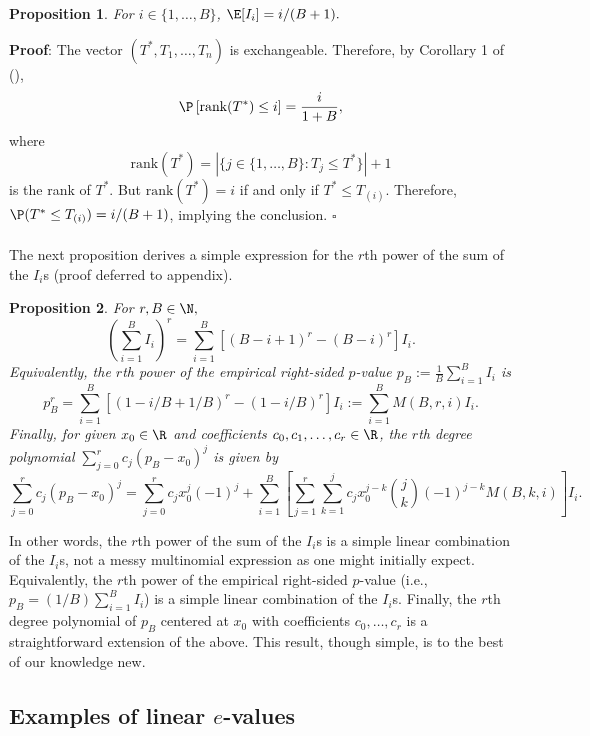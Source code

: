 \documentclass[12pt]{article}
\newtheorem{proposition}{Proposition}
\begin{document}
\begin{proposition}
For $i \in \{1, \dots, B\}$, $\E[I_i] = i/(B+1).$
\end{proposition}
\textbf{Proof}: The vector $(T^*, T_1, \dots, T_n)$ is exchangeable. Therefore, by Corollary 1 of (\cite{Kuchibhotla2020}),  $$\P\left[\textrm{rank}(T^*) \leq i\right] = \frac{i}{1+B},$$ where $$\textrm{rank}(T^*) = | \{ j \in \{1, \dots, B\} :  T_j \leq T^*  \} | + 1$$ is the rank of $T^*$. But $\textrm{rank}(T^*) = i$ if and only if $T^* \leq T_{(i)}$. Therefore, $\P( T^* \leq T_{(i)}) = i/(B+1)$, implying the conclusion. $\square$
\\ \\
The next proposition derives a simple expression for the $r$th power of the sum of the $I_i$s (proof deferred to appendix).
\begin{proposition}\label{thm:power_of_is}
For $r,B \in \N,$
$$ \left(\sum_{i=1}^B I_i\right)^r = \sum_{i=1}^B \left[ (B - i + 1)^r - (B - i)^r \right] I_i.$$ Equivalently, the $r$th power of the empirical right-sided $p$-value $p_B := \frac{1}{B} \sum_{i=1}^B  I_i $ is $$ p_B^r = \sum_{i=1}^B \left[ (1 - i/B + 1/B)^r - (1 - i/B)^r \right]I_i := \sum_{i=1}^B M(B,r,i) I_i.$$ Finally, for given $x_0 \in \R$ and coefficients $c_0, c_1, \dots, c_r \in \R$, the $r$th degree polynomial $\sum_{j=0}^r c_j(p_B - x_0)^j$ is given by
$$
\sum_{j=0}^r c_j(p_B - x_0)^j = \sum_{j=0}^r c_j x_0^j(-1)^j + \sum_{i=1}^B \left[\sum_{j=1}^r \sum_{k=1}^j c_j x^{j-k}_0 \binom{j}{k}(-1)^{j-k} M(B,k,i) \right] I_i.
$$
\end{proposition}
In other words, the $r$th power of the sum of the $I_i$s is a simple linear combination of the $I_i$s, not a messy multinomial expression as one might initially expect. Equivalently, the $r$th power of the empirical right-sided $p$-value (i.e., $p_B = (1/B) \sum_{i=1}^B I_i$) is a simple linear combination of the $I_i$s. Finally, the $r$th degree polynomial of $p_B$ centered at $x_0$ with coefficients $c_0, \dots, c_r$ is a straightforward extension of the above. This result, though simple, is to the best of our knowledge new.

\subsection*{Examples of linear $e$-values}
\end{document}
